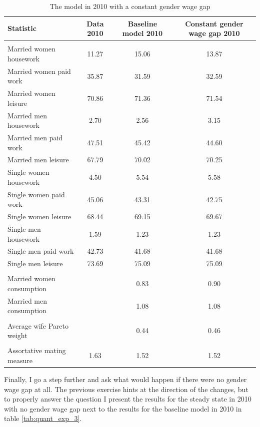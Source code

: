 \documentclass[12pt]{article}
\begin{document}
\begin{table}[]
	\centering
	\caption{The model in 2010 with a constant gender wage gap}
	\begin{tabular}{lccc}
		\toprule
		Statistic & \multicolumn{1}{p{4.045em}}{Data 2010} & \multicolumn{1}{p{6.455em}}{Baseline model 2010} & \multicolumn{1}{p{7.635em}}{Constant gender wage gap 2010} \\
		\midrule
		&       &       &  \\
		Married women housework & 11.27 & 15.06 & 13.87 \\
		Married women paid work & 35.87 & 31.59 & 32.59 \\
		Married women leisure & 70.86 & 71.36 & 71.54 \\
		Married men housework & 2.70  & 2.56  & 3.15 \\
		Married men paid work & 47.51 & 45.42 & 44.60 \\
		Married men leisure & 67.79 & 70.02 & 70.25 \\
		Single women housework & 4.50  & 5.54  & 5.58 \\
		Single women paid work & 45.06 & 43.31 & 42.75 \\
		Single women leisure & 68.44 & 69.15 & 69.67 \\
		Single men housework & 1.59  & 1.23  & 1.23 \\
		Single men paid work & 42.73 & 41.68 & 41.68 \\
		Single men leisure & 73.69 & 75.09 & 75.09 \\
		&       &       &  \\
		Married women consumption &       & 0.83  & 0.90 \\
		Married men consumption &       & 1.08  & 1.08 \\
		&       &       &  \\
		Average wife Pareto weight &       & 0.44  & 0.46 \\
		&       &       &  \\
		Assortative mating measure & 1.63  & 1.52  & 1.52 \\
		\bottomrule
		\bottomrule
	\end{tabular}
	\label{tab:quant_exp_2}
\end{table}

Finally, I go a step further and ask what would happen if there were no gender wage gap at all. The previous exercise hints at the direction of the changes, but to properly answer the question I present the results for the steady state in 2010 with no gender wage gap next to the results for the baseline model in 2010 in table \ref{tab:quant_exp_3}.
\end{document}
